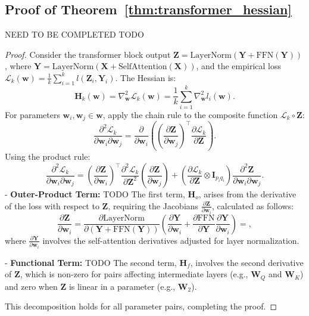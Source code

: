 \documentclass{article}
\begin{document}
\subsection{Proof of Theorem~\ref{thm:transformer_hessian}}\label{app:proof_transformer_hessian}
NEED TO BE COMPLETED TODO
\begin{proof}
Consider the transformer block output \(\mathbf{Z} = \text{LayerNorm}(\mathbf{Y} + \text{FFN}(\mathbf{Y}))\), where \(\mathbf{Y} = \text{LayerNorm}(\mathbf{X} + \text{SelfAttention}(\mathbf{X}))\), and the empirical loss \(\mathcal{L}_k(\mathbf{w}) = \frac{1}{k} \sum_{i=1}^k l(\mathbf{Z}_i, \mathbf{Y}_i)\). The Hessian is:
\[
\mathbf{H}_k(\mathbf{w}) = \nabla^2_{\mathbf{w}} \mathcal{L}_k(\mathbf{w}) = \frac{1}{k} \sum_{i=1}^k \nabla^2_{\mathbf{w}} l_i(\mathbf{w}).
\]
For parameters \(\mathbf{w}_i, \mathbf{w}_j \in \mathbf{w}\), apply the chain rule to the composite function \(\mathcal{L}_k \circ \mathbf{Z}\):
\[
\frac{\partial^2 \mathcal{L}_k}{\partial \mathbf{w}_i \partial \mathbf{w}_j} = \frac{\partial}{\partial \mathbf{w}_i} \left( \left( \frac{\partial \mathbf{Z}}{\partial \mathbf{w}_j} \right)^\top \frac{\partial \mathcal{L}_k}{\partial \mathbf{Z}} \right).
\]
Using the product rule:
\[
\frac{\partial^2 \mathcal{L}_k}{\partial \mathbf{w}_i \partial \mathbf{w}_j} = \left( \frac{\partial \mathbf{Z}}{\partial \mathbf{w}_i} \right)^\top \frac{\partial^2 \mathcal{L}_k}{\partial \mathbf{Z}^2} \left( \frac{\partial \mathbf{Z}}{\partial \mathbf{w}_j} \right) + \left( \frac{\partial \mathcal{L}_k}{\partial \mathbf{Z}} \otimes \mathbf{I}_{p_i q_i} \right) \frac{\partial^2 \mathbf{Z}}{\partial \mathbf{w}_i \partial \mathbf{w}_j}.
\]
- \textbf{Outer-Product Term:} TODO The first term, \(\mathbf{H}_o\), arises from the derivative of the loss with respect to \(\mathbf{Z}\), requiring the Jacobians \(\frac{\partial \mathbf{Z}}{\partial \mathbf{w}_i}\), calculated as follows:
\[
\frac{\partial \mathbf{Z}}{\partial \mathbf{w}_i} = \frac{\partial \text{LayerNorm}}{\partial (\mathbf{Y} + \text{FFN}(\mathbf{Y}))} \left( \frac{\partial \mathbf{Y}}{\partial \mathbf{w}_i} + \frac{\partial \text{FFN}}{\partial \mathbf{Y}} \frac{\partial \mathbf{Y}}{\partial \mathbf{w}_i} \right) = ,
\]
where \(\frac{\partial \mathbf{Y}}{\partial \mathbf{w}_i}\) involves the self-attention derivatives adjusted for layer normalization.

- \textbf{Functional Term:} TODO The second term, \(\mathbf{H}_f\), involves the second derivative of \(\mathbf{Z}\), which is non-zero for pairs affecting intermediate layers (e.g., \(\mathbf{W}_Q\) and \(\mathbf{W}_K\)) and zero when \(\mathbf{Z}\) is linear in a parameter (e.g., \(\mathbf{W}_2\)).

This decomposition holds for all parameter pairs, completing the proof.
\end{proof}
\end{document}
